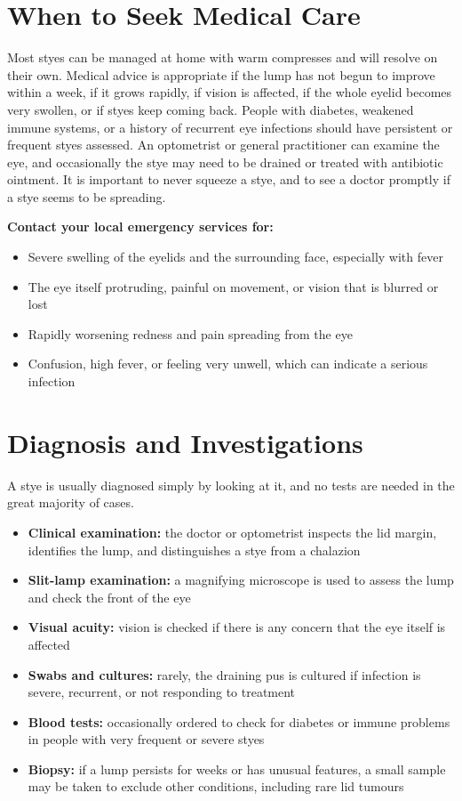 \section*{When to Seek Medical Care}
Most styes can be managed at home with warm compresses and will resolve on their own. Medical advice is appropriate if the lump has not begun to improve within a week, if it grows rapidly, if vision is affected, if the whole eyelid becomes very swollen, or if styes keep coming back. People with diabetes, weakened immune systems, or a history of recurrent eye infections should have persistent or frequent styes assessed. An optometrist or general practitioner can examine the eye, and occasionally the stye may need to be drained or treated with antibiotic ointment. It is important to never squeeze a stye, and to see a doctor promptly if a stye seems to be spreading.

\textbf{Contact your local emergency services for:}
\begin{itemize}
    \item Severe swelling of the eyelids and the surrounding face, especially with fever
    \item The eye itself protruding, painful on movement, or vision that is blurred or lost
    \item Rapidly worsening redness and pain spreading from the eye
    \item Confusion, high fever, or feeling very unwell, which can indicate a serious infection
\end{itemize}

\section*{Diagnosis and Investigations}
A stye is usually diagnosed simply by looking at it, and no tests are needed in the great majority of cases.

\begin{itemize}
    \item \textbf{Clinical examination:} the doctor or optometrist inspects the lid margin, identifies the lump, and distinguishes a stye from a chalazion
    \item \textbf{Slit-lamp examination:} a magnifying microscope is used to assess the lump and check the front of the eye
    \item \textbf{Visual acuity:} vision is checked if there is any concern that the eye itself is affected
    \item \textbf{Swabs and cultures:} rarely, the draining pus is cultured if infection is severe, recurrent, or not responding to treatment
    \item \textbf{Blood tests:} occasionally ordered to check for diabetes or immune problems in people with very frequent or severe styes
    \item \textbf{Biopsy:} if a lump persists for weeks or has unusual features, a small sample may be taken to exclude other conditions, including rare lid tumours
\end{itemize}

